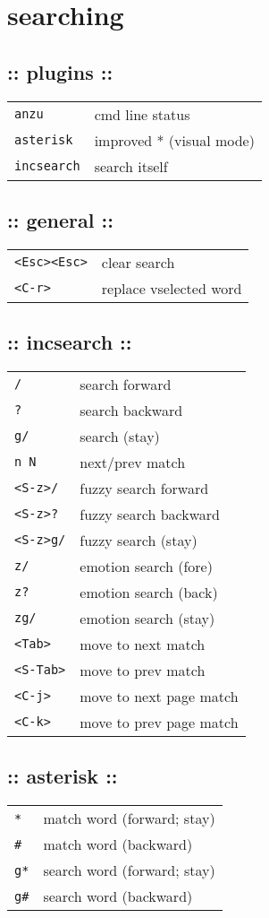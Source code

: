 \section{\hrulefill searching\hrulefill}

\subsection{:: plugins ::}
\begin{tabular}{@{}ll@{}}
    \verb!anzu!         & cmd line status \\
    \verb!asterisk!     & improved * (visual mode) \\
    \verb!incsearch!    & search itself \\
\end{tabular}

\subsection{:: general ::}
\begin{tabular}{@{}ll@{}}
    \verb!<Esc><Esc>!   & clear search \\
    \verb!<C-r>!        & replace vselected word \\
\end{tabular}

\subsection{:: incsearch ::}
\begin{tabular}{@{}ll@{}}
    \verb!/!            & search forward \\
    \verb!?!            & search backward \\
    \verb!g/!           & search (stay) \\
    \verb!n N!          & next/prev match \\
    \verb!<S-z>/!       & fuzzy search forward \\
    \verb!<S-z>?!       & fuzzy search backward \\
    \verb!<S-z>g/!      & fuzzy search (stay) \\
    \verb!z/!           & emotion search (fore) \\
    \verb!z?!           & emotion search (back) \\
    \verb!zg/!          & emotion search (stay) \\
    \verb!<Tab>!        & move to next match \\
    \verb!<S-Tab>!      & move to prev match \\
    \verb!<C-j>!        & move to next page match \\
    \verb!<C-k>!        & move to prev page match \\
\end{tabular}

\subsection{:: asterisk ::}
\begin{tabular}{@{}ll@{}}
    \verb!*!            & match word (forward; stay) \\
    \verb!#!            & match word (backward) \\
    \verb!g*!           & search word (forward; stay) \\
    \verb!g#!           & search word (backward) \\
\end{tabular}



